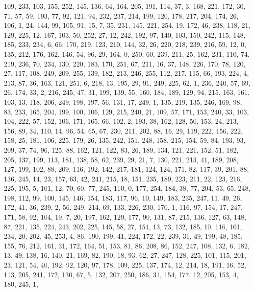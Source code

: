 \begin{DoxyCode}
       109, 233, 103, 155, 252, 145, 136, 64, 164, 205, 191, 114, 37, 3, 168, 221, 172, 30, 71, 57, 59, 193, 77, 92,
       121, 94, 232, 237, 214, 199, 120, 178, 217, 204, 174, 26, 106, 1, 24, 144, 99, 105, 91, 15, 7, 35, 231,
       145, 221, 254, 19, 172, 46, 238, 118, 21, 129, 225, 12, 167, 103, 50, 252, 27, 12, 242, 192, 97, 140, 103, 150,
       242, 115, 148, 185, 233, 234, 6, 66, 170, 219, 123, 210, 144, 32, 26, 220, 218, 239, 216, 59, 12, 0, 135,
       212, 176, 162, 146, 54, 96, 29, 164, 0, 250, 60, 239, 211, 25, 162, 231, 110, 74, 219, 236, 70, 234, 130,
       220, 183, 170, 251, 67, 211, 16, 37, 148, 226, 170, 78, 120, 27, 117, 108, 249, 209, 255, 139, 182, 213, 246,
       255, 112, 217, 115, 66, 193, 224, 4, 213, 87, 36, 163, 121, 251, 6, 218, 13, 195, 29, 91, 249, 225, 62, 1,
       236, 240, 57, 69, 26, 174, 33, 2, 216, 245, 47, 31, 199, 139, 55, 160, 184, 189, 129, 94, 215, 163, 161, 103,
       13, 118, 206, 249, 198, 197, 56, 131, 17, 249, 1, 135, 219, 135, 246, 169, 98, 83, 233, 165, 204, 199, 100,
       106, 129, 215, 240, 21, 109, 57, 171, 153, 240, 33, 103, 104, 222, 57, 152, 106, 171, 165, 66, 102, 2, 193,
       38, 162, 128, 50, 153, 24, 213, 156, 89, 34, 110, 14, 96, 54, 65, 67, 230, 211, 202, 88, 16, 29, 119, 222,
       156, 222, 158, 25, 181, 106, 225, 179, 26, 135, 242, 151, 248, 158, 215, 154, 59, 84, 193, 93, 209, 37, 74,
       96, 125, 88, 162, 121, 122, 83, 26, 189, 134, 121, 221, 152, 51, 182, 205, 137, 199, 113, 181, 138, 58, 62,
       239, 29, 21, 7, 130, 221, 213, 41, 189, 208, 127, 199, 102, 88, 209, 116, 192, 142, 217, 181, 124, 124, 171,
       82, 117, 39, 201, 88, 136, 245, 14, 23, 157, 63, 42, 241, 215, 18, 151, 235, 189, 223, 211, 22, 123, 216,
       225, 195, 5, 101, 12, 70, 60, 77, 245, 110, 0, 177, 254, 184, 38, 77, 204, 53, 65, 248, 198, 112, 99, 100,
       145, 146, 154, 183, 117, 96, 10, 149, 183, 235, 247, 11, 49, 26, 172, 41, 36, 239, 2, 56, 249, 214, 69, 133,
       226, 230, 170, 1, 116, 97, 154, 17, 247, 171, 58, 92, 104, 19, 7, 20, 197, 162, 129, 177, 90, 131, 87, 215,
       136, 127, 63, 148, 87, 221, 135, 224, 243, 202, 225, 145, 58, 27, 154, 13, 73, 132, 185, 10, 116, 101, 234,
       20, 202, 45, 253, 4, 86, 190, 199, 41, 224, 172, 22, 239, 31, 49, 199, 48, 185, 155, 76, 212, 161, 31, 172,
       164, 51, 153, 81, 86, 208, 86, 152, 247, 108, 132, 6, 182, 13, 49, 138, 16, 140, 21, 169, 82, 190, 18, 93, 62,
       27, 247, 128, 225, 101, 115, 201, 23, 121, 54, 40, 192, 92, 120, 97, 178, 109, 225, 137, 174, 12, 214, 18,
       191, 16, 52, 113, 205, 241, 172, 130, 67, 5, 132, 207, 250, 186, 31, 154, 177, 12, 205, 153, 4, 180, 245, 1,

\end{DoxyCode}

